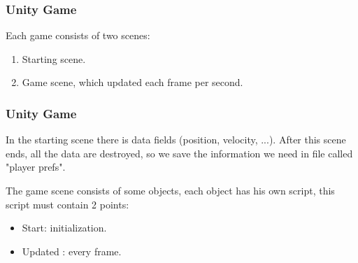 \documentclass{beamer}
\begin{document}
\begin{frame}
\frametitle{Unity Game}
Each game consists of two scenes:
\begin{enumerate}
	\item Starting scene.
	\item Game scene, which updated each frame per second.
\end{enumerate}
\end{frame}
\begin{frame}
\frametitle{Unity Game}
In the starting scene there is data fields (position, velocity, ...). After this scene ends, all the data are destroyed, so we save the information we need in file called "player prefs".

The game scene consists of some objects, each object has his own script, this script must contain 2 points:
\begin{itemize}
	\item Start: initialization.
	\item Updated : every frame.
\end{itemize} 
\end{frame}
\end{document}
